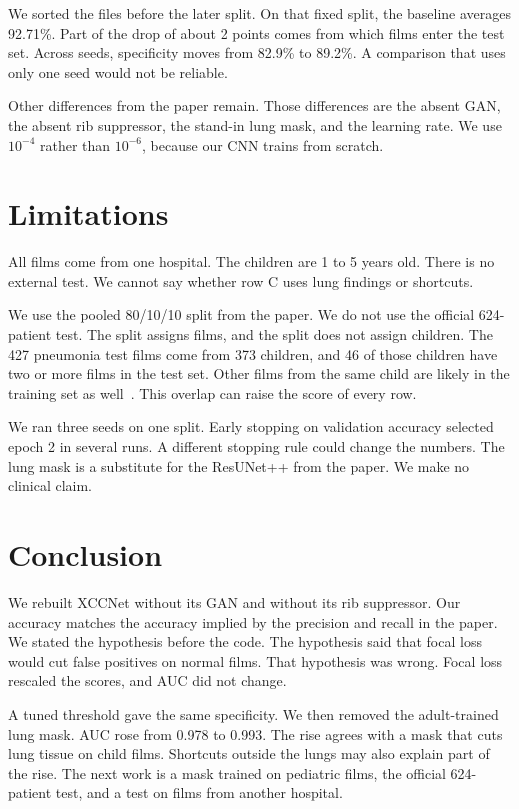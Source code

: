 \documentclass[conference]{IEEEtran}
\begin{document}
We sorted the files before the later split. On that fixed split, the baseline averages 92.71\%. Part of the drop of about 2 points comes from which films enter the test set. Across seeds, specificity moves from 82.9\% to 89.2\%. A comparison that uses only one seed would not be reliable.

Other differences from the paper remain. Those differences are the absent GAN, the absent rib suppressor, the stand-in lung mask, and the learning rate. We use $10^{-4}$ rather than $10^{-6}$, because our CNN trains from scratch.

\section{Limitations}
All films come from one hospital. The children are 1 to 5 years old. There is no external test. We cannot say whether row C uses lung findings or shortcuts.

We use the pooled 80/10/10 split from the paper. We do not use the official 624-patient test. The split assigns films, and the split does not assign children. The 427 pneumonia test films come from 373 children, and 46 of those children have two or more films in the test set. Other films from the same child are likely in the training set as well~\cite{salehi2021}. This overlap can raise the score of every row.

We ran three seeds on one split. Early stopping on validation accuracy selected epoch 2 in several runs. A different stopping rule could change the numbers. The lung mask is a substitute for the ResUNet++ from the paper. We make no clinical claim.

\section{Conclusion}
We rebuilt XCCNet without its GAN and without its rib suppressor. Our accuracy matches the accuracy implied by the precision and recall in the paper. We stated the hypothesis before the code. The hypothesis said that focal loss would cut false positives on normal films. That hypothesis was wrong. Focal loss rescaled the scores, and AUC did not change.

A tuned threshold gave the same specificity. We then removed the adult-trained lung mask. AUC rose from 0.978 to 0.993. The rise agrees with a mask that cuts lung tissue on child films. Shortcuts outside the lungs may also explain part of the rise. The next work is a mask trained on pediatric films, the official 624-patient test, and a test on films from another hospital.
\end{document}
